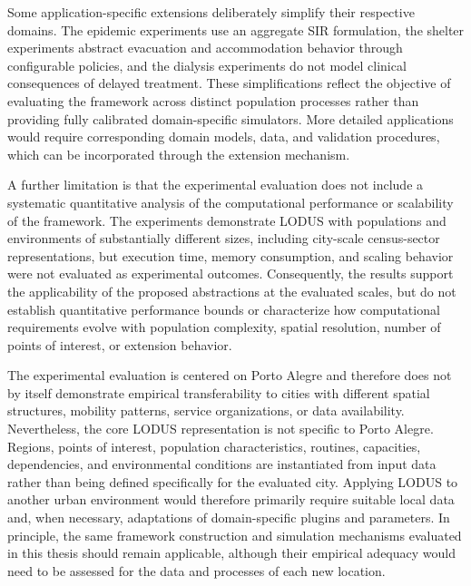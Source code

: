 Some application-specific extensions deliberately simplify their respective domains.
The epidemic experiments use an aggregate SIR formulation, the shelter experiments
abstract evacuation and accommodation behavior through configurable policies, and
the dialysis experiments do not model clinical consequences of delayed treatment.
These simplifications reflect the objective of evaluating the framework across distinct
population processes rather than providing fully calibrated domain-specific simulators.
More detailed applications would require corresponding domain models, data, and
validation procedures, which can be incorporated through the extension mechanism.

A further limitation is that the experimental evaluation does not include a systematic quantitative analysis of the computational performance or scalability of the framework. The experiments demonstrate LODUS with populations and environments of substantially different sizes, including city-scale census-sector representations, but execution time, memory consumption, and scaling behavior were not evaluated as experimental outcomes. Consequently, the results support the applicability of the proposed abstractions at the evaluated scales, but do not establish quantitative performance bounds or characterize how computational requirements evolve with population complexity, spatial resolution, number of points of interest, or extension behavior.

The experimental evaluation is centered on Porto Alegre and therefore does not by
itself demonstrate empirical transferability to cities with different spatial structures,
mobility patterns, service organizations, or data availability. Nevertheless, the core
LODUS representation is not specific to Porto Alegre. Regions, points of interest,
population characteristics, routines, capacities, dependencies, and environmental
conditions are instantiated from input data rather than being defined specifically for
the evaluated city. Applying LODUS to another urban environment would therefore
primarily require suitable local data and, when necessary, adaptations of
domain-specific plugins and parameters. In principle, the same framework construction
and simulation mechanisms evaluated in this thesis should remain applicable, although
their empirical adequacy would need to be assessed for the data and processes of each
new location.

